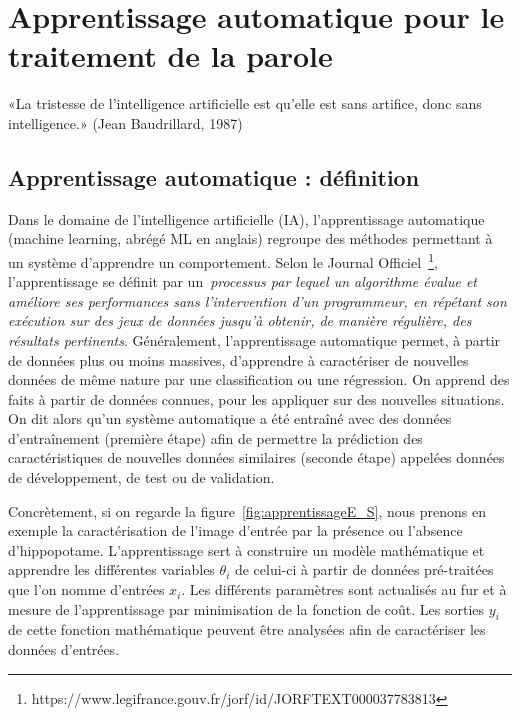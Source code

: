 \chapter{Apprentissage automatique pour le traitement de la parole}
\label{chapitre2}
«La tristesse de l'intelligence artificielle est qu'elle est sans artifice, donc sans intelligence.»  (Jean Baudrillard, 1987)


\section{Apprentissage automatique : définition}

Dans le domaine de l'intelligence artificielle (IA), l'apprentissage automatique (machine learning, abrégé ML en anglais) regroupe des méthodes permettant à un système d'apprendre un comportement. Selon le Journal Officiel~\footnote{https://www.legifrance.gouv.fr/jorf/id/JORFTEXT000037783813}, l'apprentissage se définit par un~\textit{processus par lequel un algorithme évalue et améliore ses performances sans l'intervention d'un programmeur, en répétant son exécution sur des jeux de données jusqu'à obtenir, de manière régulière, des résultats pertinents}. Généralement, l'apprentissage automatique permet, à partir de données plus ou moins massives, d'apprendre à caractériser de nouvelles données de même nature par une classification ou une régression. On apprend des faits à partir de données connues, pour les appliquer sur des nouvelles situations. On dit alors qu'un système automatique a été entraîné avec des données d’entraînement (première étape) afin de permettre la prédiction des caractéristiques de nouvelles données similaires (seconde étape) appelées données de développement, de test ou de validation.



Concrètement, si on regarde la figure~\ref{fig:apprentissageE_S}, nous prenons en exemple la caractérisation de l'image d'entrée par la présence ou l'absence d'hippopotame. L'apprentissage sert à construire un modèle mathématique et apprendre les différentes variables $\theta_i$ de celui-ci à partir de données pré-traitées que l'on nomme d'entrées $x_i$. Les différents paramètres sont actualisés au fur et à mesure de l'apprentissage par minimisation de la fonction de coût. Les sorties $y_i$ de cette fonction mathématique peuvent être analysées afin de caractériser les données d'entrées.

